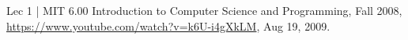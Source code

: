 \documentclass[journal]{IEEEtran}
\begin{document}
%
%
%
\begin{thebibliography}{1}

Lec 1 | MIT 6.00 Introduction to Computer Science and Programming, Fall 2008, \url{https://www.youtube.com/watch?v=k6U-i4gXkLM}, Aug 19, 2009.








\end{thebibliography}

% 







\end{document}
